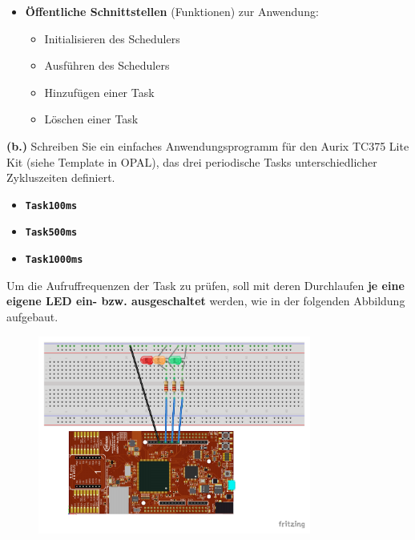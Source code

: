 \documentclass[
    fontsize=12pt,                      %
    paper=a4,                           %
    twoside=off,                       %
    DIV=15,                             %
    BCOR=12mm,                          %
    headings=normal,                    %
    headsepline=false,                   %
    footsepline=false,                  %
    headinclude=true,                   %
    footinclude=false,                  %
    toc=listof,                         %
    toc=bib,                            %
    chapterprefix=false,                %
    appendixprefix=false,               %
    numbers=noendperiod,                %
    captions=tableabove,                %
    footnotes=multiple,                 %
    bibliography=oldstyle,              %
    draft=false,                        %
]{scrreprt}
\newcommand{\Farbcode}[1]{\texttt{\textbf{\textcolor{myred}{#1}}}}
\begin{document}
\begin{itemize}
\item \textbf{Öffentliche Schnittstellen} (Funktionen) zur Anwendung:
\begin{itemize}
\item Initialisieren des Schedulers 
\item Ausführen des Schedulers
\item Hinzufügen einer Task
\item Löschen einer Task
\end{itemize}

\end{itemize}

\vskip 0.5cm
\noindent\textbf{(b.)}
\vskip 0.2cm
\noindent
Schreiben Sie ein einfaches Anwendungsprogramm für den Aurix TC375 Lite Kit (siehe Template in OPAL), das drei periodische Tasks unterschiedlicher Zykluszeiten definiert.
\begin{itemize}
\item \Farbcode{Task100ms}
\item \Farbcode{Task500ms}
\item \Farbcode{Task1000ms}
\end{itemize}
\noindent
Um die Aufruffrequenzen der Task zu prüfen, soll mit deren Durchlaufen \textbf{je eine eigene LED ein- bzw. ausgeschaltet} werden, wie in der folgenden Abbildung aufgebaut.

\begin{figure}[H]
	\centering
	\includegraphics[width=0.8\textwidth]{Figures/Scheduler_Steckplatine}
\end{figure}
\end{document}
